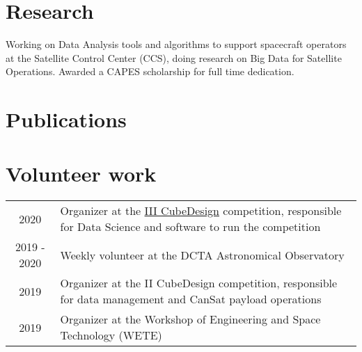 \documentclass[]{deedy-resume-openfont}
\begin{document}
\begin{minipage}[t]{0.66\textwidth}

\section{Research}
Working on Data Analysis tools and algorithms to support spacecraft operators at the Satellite Control Center (CCS), doing research on Big Data for Satellite Operations.
Awarded a CAPES scholarship for full time dedication.
\sectionsep


\section{Publications}
\vspace{15pt}
\renewcommand\refname{\vskip -1.5cm} %


\nocite{*}


\section{Volunteer work}
\begin{tabular}{cp{10cm}}
2020 & Organizer at the \href{http://www.inpe.br/cubedesign/2020/}{III CubeDesign} competition, responsible for Data Science and software to run the competition \\
2019 - 2020 & Weekly volunteer at the DCTA Astronomical Observatory \\
2019 & Organizer at the II CubeDesign competition, responsible for data management and CanSat payload operations\\
2019 & Organizer at the Workshop of Engineering and Space Technology (WETE) \\
\end{tabular}

\end{minipage}
\end{document}
